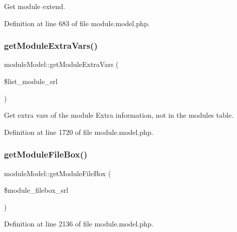 Get module extend. 



Definition at line 683 of file module.\+model.\+php.

\hypertarget{classmoduleModel_a4e93226573048a7b9c8e2cb842d0cb30}{}\label{classmoduleModel_a4e93226573048a7b9c8e2cb842d0cb30} 
\subsubsection{\texorpdfstring{get\+Module\+Extra\+Vars()}{getModuleExtraVars()}}
{\footnotesize\ttfamily module\+Model\+::get\+Module\+Extra\+Vars (\begin{DoxyParamCaption}\item[{}]{\$list\+\_\+module\+\_\+srl }\end{DoxyParamCaption})}



Get extra vars of the module Extra information, not in the modules table. 



Definition at line 1720 of file module.\+model.\+php.

\hypertarget{classmoduleModel_a792e14b71d66044513a646a44216be17}{}\label{classmoduleModel_a792e14b71d66044513a646a44216be17} 
\subsubsection{\texorpdfstring{get\+Module\+File\+Box()}{getModuleFileBox()}}
{\footnotesize\ttfamily module\+Model\+::get\+Module\+File\+Box (\begin{DoxyParamCaption}\item[{}]{\$module\+\_\+filebox\+\_\+srl }\end{DoxyParamCaption})}



Definition at line 2136 of file module.\+model.\+php.

\hypertarget{classmoduleModel_a8f3a098b40649594a591e5ea8bd15d96}{}\label{classmoduleModel_a8f3a098b40649594a591e5ea8bd15d96} 
